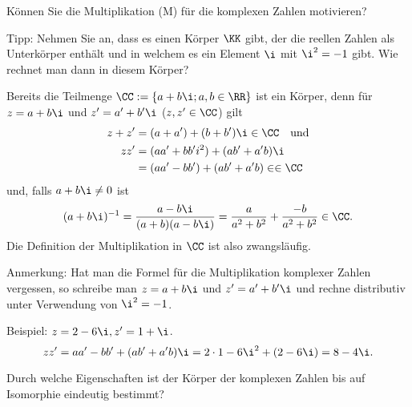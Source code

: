\begin{frage}
Können Sie die Multiplikation (M) für die komplexen Zahlen motivieren?

Tipp: Nehmen Sie an, dass es einen Körper $\KK$ gibt, der die reellen Zahlen 
als Unterkörper enthält und in welchem es ein Element $\i$ mit $\i^2=-1$ 
gibt. Wie rechnet man dann in diesem Körper?
\end{frage}

\begin{antwort}
Bereits die Teilmenge $\CC:=\{a+b\i; a,b\in\RR\}$ ist ein Körper, denn für 
$z=a+b\i$ und $z'=a'+b'\i$ ($z,z'\in\CC$) gilt
\begin{align*}
z+z' &= (a+a') + (b+b') \i \in \CC\quad\text{und}\\
zz' &= (aa' + bb' i^2) + (ab'+ a'b) \i \\
&= (aa'-bb') + (ab'+a'b)\in \in \CC
\end{align*}
und, falls $a+b\i\not=0$ ist
\[
(a+b\i)^{-1} = \frac{a-b\i}{(a+b)(a-b\i)} = 
\frac{a}{a^2+b^2} + \frac{-b}{a^2+b^2}\in\CC.
\]
Die Definition der Multiplikation in $\CC$ ist also zwangsläufig. 

Anmerkung: Hat man die Formel für die Multiplikation komplexer Zahlen 
vergessen, so schreibe man $z=a+b\i$ und $z'=a'+b'\i$ und rechne 
distributiv unter Verwendung von $\i^2 = -1$.

Beispiel: $z=2-6\i, z'=1+\i$.
\[
zz' = aa' - bb' + (ab'+a'b) \i = 2\cdot 1 - 6\i^2 + (2-6\i) = 8-4\i.
\]
\end{antwort}



\begin{frage}
Durch welche Eigenschaften ist der Körper der komplexen Zahlen bis auf 
Isomorphie eindeutig bestimmt?
\end{frage}

